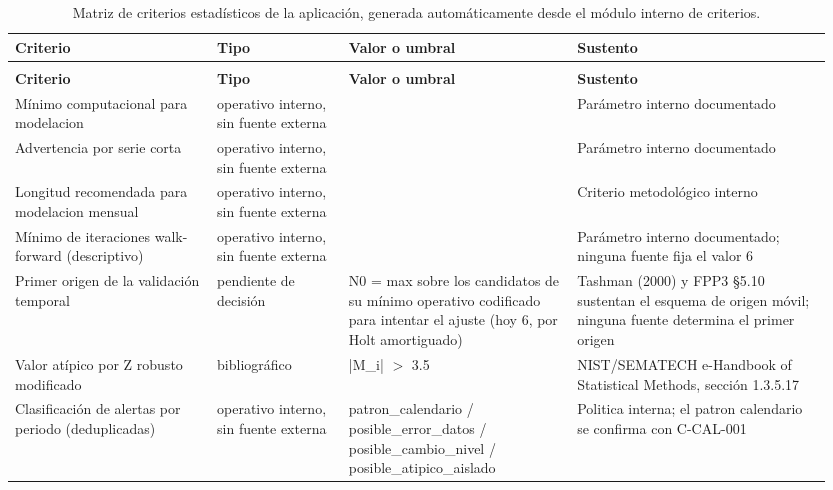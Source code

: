 {\scriptsize
\begin{longtable}{@{}>{\raggedright\arraybackslash}p{0.238\linewidth}>{\raggedright\arraybackslash}p{0.152\linewidth}>{\raggedright\arraybackslash}p{0.266\linewidth}>{\raggedright\arraybackslash}p{0.295\linewidth}@{}}
\caption{Matriz de criterios estad\'isticos de la aplicaci\'on, generada autom\'aticamente desde el m\'odulo interno de criterios.}
\label{tab:matriz_criterios}\\
\toprule
\textbf{Criterio} & \textbf{Tipo} & \textbf{Valor o umbral} & \textbf{Sustento} \\
\midrule
\endfirsthead
\multicolumn{4}{l}{\emph{Continuaci\'on de la Tabla~\ref{tab:matriz_criterios}}}\\
\toprule
\textbf{Criterio} & \textbf{Tipo} & \textbf{Valor o umbral} & \textbf{Sustento} \\
\midrule
\endhead
\bottomrule
\endlastfoot
Mínimo computacional para modelacion & operativo interno, sin fuente externa & 8 & Parámetro interno documentado \\
Advertencia por serie corta & operativo interno, sin fuente externa & 18 & Parámetro interno documentado \\
Longitud recomendada para modelacion mensual & operativo interno, sin fuente externa & 24 & Criterio metodológico interno \\
Mínimo de iteraciones walk-forward (descriptivo) & operativo interno, sin fuente externa & 6 & Parámetro interno documentado; ninguna fuente fija el valor 6 \\
Primer origen de la validación temporal & pendiente de decisión & N0 = max sobre los candidatos de su mínimo operativo codificado para intentar el ajuste (hoy 6, por Holt amortiguado) & Tashman (2000) y FPP3 §5.10 sustentan el esquema de origen móvil; ninguna fuente determina el primer origen \\
Valor atípico por Z robusto modificado & bibliográfico & |M\_\allowbreak{}i| $>$ 3.5 & NIST/SEMATECH e-Handbook of Statistical Methods, sección 1.3.5.17 \\
Clasificación de alertas por periodo (deduplicadas) & operativo interno, sin fuente externa & patron\_\allowbreak{}calendario / posible\_\allowbreak{}error\_\allowbreak{}datos / posible\_\allowbreak{}cambio\_\allowbreak{}nivel / posible\_\allowbreak{}atipico\_\allowbreak{}aislado & Politica interna; el patron calendario se confirma con C-CAL-001 \\

\end{longtable}}

